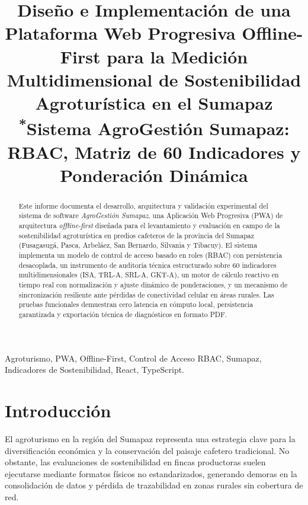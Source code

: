 \documentclass[conference]{IEEEtran}
\begin{document}
\title{Diseño e Implementación de una Plataforma Web Progresiva Offline-First para la Medición Multidimensional de Sostenibilidad Agroturística en el Sumapaz\\
{\footnotesize \textsuperscript{*}Sistema AgroGestión Sumapaz: RBAC, Matriz de 60 Indicadores y Ponderación Dinámica}}

\author{
}

\maketitle

\begin{abstract}
Este informe documenta el desarrollo, arquitectura y validación experimental del sistema de software \textit{AgroGestión Sumapaz}, una Aplicación Web Progresiva (PWA) de arquitectura \textit{offline-first} diseñada para el levantamiento y evaluación en campo de la sostenibilidad agroturística en predios cafeteros de la provincia del Sumapaz (Fusagasugá, Pasca, Arbeláez, San Bernardo, Silvania y Tibacuy). El sistema implementa un modelo de control de acceso basado en roles (RBAC) con persistencia desacoplada, un instrumento de auditoría técnica estructurado sobre 60 indicadores multidimensionales (ISA, TRL-A, SRL-A, GKT-A), un motor de cálculo reactivo en tiempo real con normalización y ajuste dinámico de ponderaciones, y un mecanismo de sincronización resiliente ante pérdidas de conectividad celular en áreas rurales. Las pruebas funcionales demuestran cero latencia en cómputo local, persistencia garantizada y exportación técnica de diagnósticos en formato PDF.
\end{abstract}

\begin{IEEEkeywords}
Agroturismo, PWA, Offline-First, Control de Acceso RBAC, Sumapaz, Indicadores de Sostenibilidad, React, TypeScript.
\end{IEEEkeywords}

\section{Introducción}
El agroturismo en la región del Sumapaz representa una estrategia clave para la diversificación económica y la conservación del paisaje cafetero tradicional. No obstante, las evaluaciones de sostenibilidad en fincas productoras suelen ejecutarse mediante formatos físicos no estandarizados, generando demoras en la consolidación de datos y pérdida de trazabilidad en zonas rurales sin cobertura de red.
\end{document}
